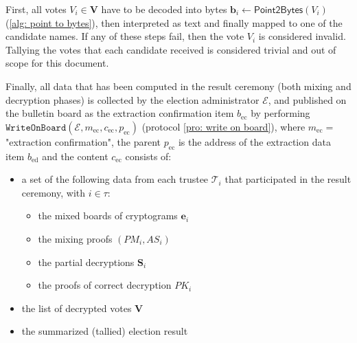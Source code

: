 First, all votes $V_i \in \boldsymbol{V}$ have to be decoded into bytes $\boldsymbol{b}_i \gets \mathsf{Point2Bytes}(V_i)$ (\cref{alg: point to bytes}), then interpreted as text and finally mapped to one of the candidate names. If any of these steps fail, then the vote $V_i$ is considered invalid. Tallying the votes that each candidate received is considered trivial and out of scope for this document.

Finally, all data that has been computed in the result ceremony (both mixing and decryption phases) is collected by the election administrator $\mathcal{E}$, and published on the bulletin board as the extraction confirmation item $b_\mathrm{ec}$ by performing $\mathtt{WriteOnBoard}(\mathcal{E}, m_\mathrm{ec}, c_\mathrm{ec}, p_\mathrm{ec})$ (protocol \ref{pro: write on board}), where $m_\mathrm{ec} = $ "extraction confirmation", the parent $p_\mathrm{ec}$ is the address of the extraction data item $b_\mathrm{ed}$  and the content $c_\mathrm{ec}$ consists of:
\begin{itemize}
    \item a set of the following data from each trustee $\mathcal{T}_i$ that participated in the result ceremony, with $i \in \tau$:
    \begin{itemize}
        \item the mixed boards of cryptograms $\boldsymbol{e}_i$
        \item the mixing proofs $(PM_i, AS_i)$
        \item the partial decryptions $\boldsymbol{S}_i$
        \item the proofs of correct decryption $PK_i$
    \end{itemize}
    \item the list of decrypted votes $\boldsymbol{V}$
    \item the summarized (tallied) election result
\end{itemize}
